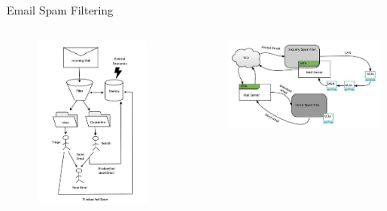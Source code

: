 \documentclass[nobackground,dvipsnames,table]{beamer}
\begin{document}
\begin{frame}{Email Spam Filtering}
    \begin{columns}
            \begin{figure}
                \centering
                \includegraphics[width=\textwidth]{client-side-filter}
            \end{figure}
            \begin{figure}
                \centering
                \includegraphics[width=\textwidth]{enterprise-side-filter}

\end{figure}
\end{columns}
\end{frame}
\end{document}
